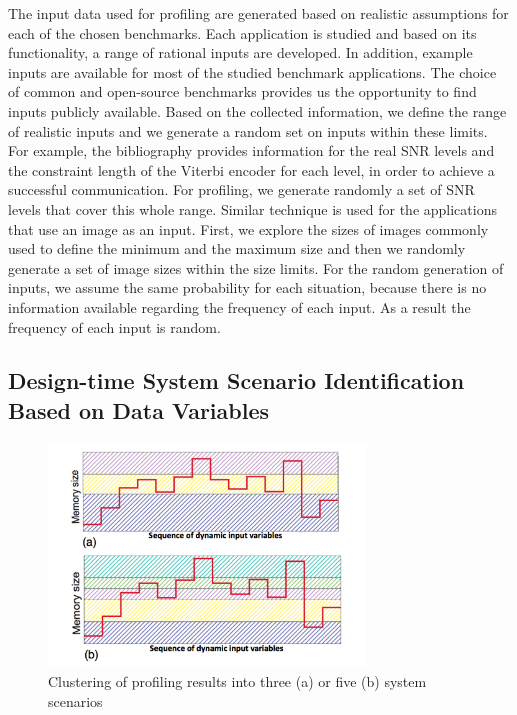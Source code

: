 The input data used for profiling are generated based on realistic assumptions for each of the chosen benchmarks. 
Each application is studied and based on its functionality, a range of rational inputs are developed. 
In addition, example inputs are available for most of the studied benchmark applications. 
The choice of common and open-source benchmarks provides us the opportunity to find inputs publicly available. 
Based on the collected information, we define the range of realistic inputs and we generate a random set on inputs within these limits. 
For example, the bibliography provides information for the real SNR levels and the constraint length of the Viterbi encoder for each level, in order to achieve a  successful communication. 
For profiling, we generate randomly a set of SNR levels that cover this whole range. 
Similar technique is used for the applications that use an image as an input. 
First, we explore the sizes of images commonly used to define the minimum and the maximum size and then we randomly generate a set of image sizes within the size limits. 
For the random generation of inputs, we assume the same probability for each situation, because there is no information available regarding the frequency of each input. 
As a result the frequency of each input is random. 

\subsection{Design-time System Scenario Identification Based on Data Variables}

\begin{figure}
\centering
\includegraphics[width=0.75\textwidth]{C/1Dclustering.pdf}
\caption{Clustering of profiling results into three (a) or five (b) system scenarios}
\label{fig:clusteringC}
\end{figure}

